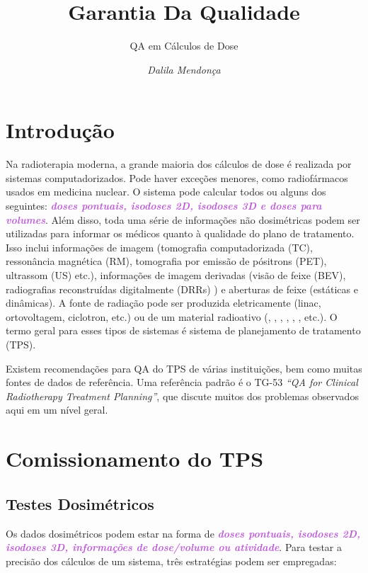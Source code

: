 \documentclass[11pt,a4paper]{article}
\title{\LobsterTwo\Huge{Garantia Da Qualidade}}
\author{\LobsterTwo\Large{QA em Cálculos de Dose}\nocite{*}}
\date{\LobsterTwo\textit{Dalila Mendonça}}
\begin{document}
	\maketitle

\section{Introdução}

	Na radioterapia moderna, a grande maioria dos cálculos de dose é realizada por sistemas computadorizados. Pode haver exceções menores, como radiofármacos usados em medicina nuclear. O sistema pode calcular todos ou alguns dos seguintes: \textcolor{MediumOrchid}{\textbf{\textit{doses pontuais, isodoses 2D, isodoses 3D e doses para volumes}}}. Além disso, toda uma série de informações não dosimétricas podem ser utilizadas para informar os médicos quanto à qualidade do plano de tratamento. Isso inclui informações de imagem (tomografia computadorizada (TC), ressonância magnética (RM), tomografia por emissão de pósitrons (PET), ultrassom (US) etc.), informações de imagem derivadas (visão de feixe (BEV), radiografias reconstruídas digitalmente (DRRs) ) e aberturas de feixe (estáticas e dinâmicas). A fonte de radiação pode ser produzida eletricamente (linac, ortovoltagem, ciclotron, etc.) ou de um material radioativo (, , , , , , etc.). O termo geral para esses tipos de sistemas é sistema de planejamento de tratamento (TPS).

	Existem recomendações para QA do TPS  de várias instituições, bem como muitas fontes de dados de referência. Uma referência padrão é o TG-53 \textit{``QA for Clinical Radiotherapy Treatment Planning''}, que discute muitos dos problemas observados aqui em um nível geral.

\section{Comissionamento do TPS}

\subsection*{Testes Dosimétricos}

	Os dados dosimétricos podem estar na forma de \textcolor{MediumOrchid}{\textbf{\textit{doses pontuais, isodoses 2D, isodoses 3D, informações de dose/volume ou atividade}}}. Para testar a precisão dos cálculos de um sistema, três estratégias podem ser empregadas:
\end{document}
